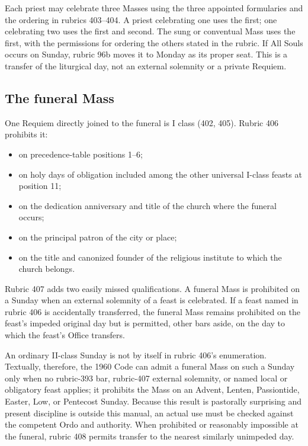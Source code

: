 Each priest may celebrate three Masses using the three appointed formularies and the ordering in rubrics 403--404. A priest celebrating one uses the first; one celebrating two uses the first and second. The sung or conventual Mass uses the first, with the permissions for ordering the others stated in the rubric. If All Souls occurs on Sunday, rubric 96b moves it to Monday as its proper seat. This is a transfer of the liturgical day, not an external solemnity or a private Requiem.

\subsection{The funeral Mass}

One Requiem directly joined to the funeral is I class (402, 405). Rubric 406 prohibits it:

\begin{itemize}
\item on precedence-table positions 1--6;
\item on holy days of obligation included among the other universal I-class feasts at position 11;
\item on the dedication anniversary and title of the church where the funeral occurs;
\item on the principal patron of the city or place;
\item on the title and canonized founder of the religious institute to which the church belongs.
\end{itemize}

Rubric 407 adds two easily missed qualifications. A funeral Mass is prohibited on a Sunday when an external solemnity of a feast is celebrated. If a feast named in rubric 406 is accidentally transferred, the funeral Mass remains prohibited on the feast's impeded original day but is permitted, other bars aside, on the day to which the feast's Office transfers.

An ordinary II-class Sunday is not by itself in rubric 406's enumeration. Textually, therefore, the 1960 Code can admit a funeral Mass on such a Sunday only when no rubric-393 bar, rubric-407 external solemnity, or named local or obligatory feast applies; it prohibits the Mass on an Advent, Lenten, Passiontide, Easter, Low, or Pentecost Sunday. Because this result is pastorally surprising and present discipline is outside this manual, an actual use must be checked against the competent Ordo and authority. When prohibited or reasonably impossible at the funeral, rubric 408 permits transfer to the nearest similarly unimpeded day.

